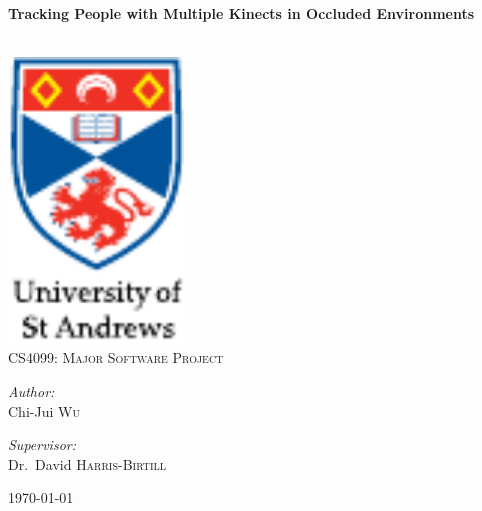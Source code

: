 
\begin{titlepage}

\begin{center}

\HRule \\[0.4cm]
{\huge \bfseries Tracking People with Multiple Kinects in Occluded Environments
\\[0.4cm] }

\HRule \\[3cm]


\includegraphics[width=0.35\textwidth]{figs/st-andrews-logo}~\\[1cm]

\textsc{\Large CS4099: Major Software Project}\\[1cm]

\noindent

\begin{minipage}{0.3\textwidth}

\begin{center} \large

\emph{Author:}\\

Chi-Jui \textsc{Wu}

\end{center}

\end{minipage}%
\begin{minipage}{0.3\textwidth}

\begin{center} \large

\emph{Supervisor:} \\

Dr.~David \textsc{Harris-Birtill}

\end{center}

\end{minipage}%

\vfill

{\large \today}

\end{center}

\end{titlepage}
